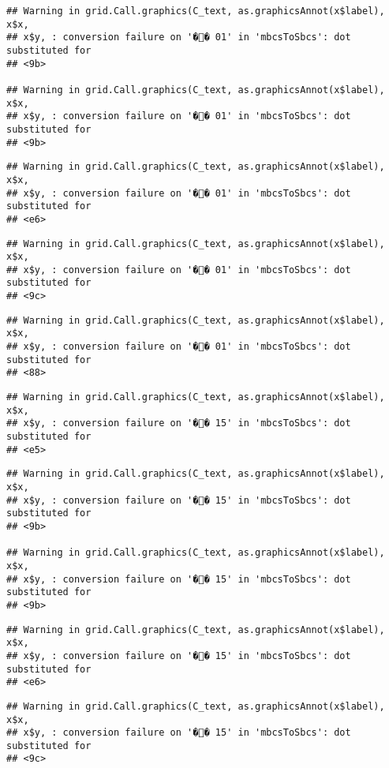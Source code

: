 \documentclass[]{article}
\begin{document}
\begin{verbatim}
## Warning in grid.Call.graphics(C_text, as.graphicsAnnot(x$label), x$x,
## x$y, : conversion failure on '�� 01' in 'mbcsToSbcs': dot substituted for
## <9b>

## Warning in grid.Call.graphics(C_text, as.graphicsAnnot(x$label), x$x,
## x$y, : conversion failure on '�� 01' in 'mbcsToSbcs': dot substituted for
## <9b>
\end{verbatim}

\begin{verbatim}
## Warning in grid.Call.graphics(C_text, as.graphicsAnnot(x$label), x$x,
## x$y, : conversion failure on '�� 01' in 'mbcsToSbcs': dot substituted for
## <e6>
\end{verbatim}

\begin{verbatim}
## Warning in grid.Call.graphics(C_text, as.graphicsAnnot(x$label), x$x,
## x$y, : conversion failure on '�� 01' in 'mbcsToSbcs': dot substituted for
## <9c>
\end{verbatim}

\begin{verbatim}
## Warning in grid.Call.graphics(C_text, as.graphicsAnnot(x$label), x$x,
## x$y, : conversion failure on '�� 01' in 'mbcsToSbcs': dot substituted for
## <88>
\end{verbatim}

\begin{verbatim}
## Warning in grid.Call.graphics(C_text, as.graphicsAnnot(x$label), x$x,
## x$y, : conversion failure on '�� 15' in 'mbcsToSbcs': dot substituted for
## <e5>
\end{verbatim}

\begin{verbatim}
## Warning in grid.Call.graphics(C_text, as.graphicsAnnot(x$label), x$x,
## x$y, : conversion failure on '�� 15' in 'mbcsToSbcs': dot substituted for
## <9b>

## Warning in grid.Call.graphics(C_text, as.graphicsAnnot(x$label), x$x,
## x$y, : conversion failure on '�� 15' in 'mbcsToSbcs': dot substituted for
## <9b>
\end{verbatim}

\begin{verbatim}
## Warning in grid.Call.graphics(C_text, as.graphicsAnnot(x$label), x$x,
## x$y, : conversion failure on '�� 15' in 'mbcsToSbcs': dot substituted for
## <e6>
\end{verbatim}

\begin{verbatim}
## Warning in grid.Call.graphics(C_text, as.graphicsAnnot(x$label), x$x,
## x$y, : conversion failure on '�� 15' in 'mbcsToSbcs': dot substituted for
## <9c>
\end{verbatim}
\end{document}

